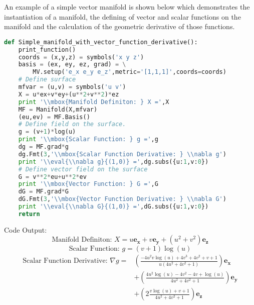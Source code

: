 \documentclass[10pt]{article}
\newcommand{\eval}[2]{\left . {#1} \right |_{#2}}
\begin{document}
An example of a simple vector manifold is shown below which demonstrates the instantiation of a manifold, the defining
of vector and scalar functions on the manifold and the calculation of the geometric derivative of those functions. \\

\begin{lstlisting}[language=Python,showspaces=false,showstringspaces=false,backgroundcolor=\color{gray},frame=single]
def Simple_manifold_with_vector_function_derivative():
    print_function()
    coords = (x,y,z) = symbols('x y z')
    basis = (ex, ey, ez, grad) = \
        MV.setup('e_x e_y e_z',metric='[1,1,1]',coords=coords)
    # Define surface
    mfvar = (u,v) = symbols('u v')
    X = u*ex+v*ey+(u**2+v**2)*ez
    print '\\mbox{Manifold Definiton: } X =',X
    MF = Manifold(X,mfvar)
    (eu,ev) = MF.Basis()
    # Define field on the surface.
    g = (v+1)*log(u)
    print '\\mbox{Scalar Function: } g =',g
    dg = MF.grad*g
    dg.Fmt(3,'\\mbox{Scalar Function Derivative: } \\nabla g')
    print '\\eval{\\nabla g}{(1,0)} =',dg.subs({u:1,v:0})
    # Define vector field on the surface
    G = v**2*eu+u**2*ev
    print '\\mbox{Vector Function: } G =',G
    dG = MF.grad*G
    dG.Fmt(3,'\\mbox{Vector Function Derivative: } \\nabla G')
    print '\\eval{\\nabla G}{(1,0)} =',dG.subs({u:1,v:0})
    return
\end{lstlisting}
Code Output:
\begin{equation*} \mbox{Manifold Definiton: } X = u\bm{e_{x}}+v\bm{e_{y}}+\left ( u^{2} + v^{2}\right ) \bm{e_{z}} \end{equation*}
\begin{equation*} \mbox{Scalar Function: } g = \left(v + 1\right) \log{\left (u \right )} \end{equation*}
 \begin{align*} \mbox{Scalar Function Derivative: } \nabla g =  & \left ( \frac{- 4 u^{2} v \log{\left (u \right )} + 4 v^{3} + 4 v^{2} + v + 1}{u \left(4 u^{2} + 4 v^{2} + 1\right)}\right ) \bm{e_{x}} \\  & +\left ( \frac{4 u^{2} \log{\left (u \right )} - 4 v^{2} - 4 v + \log{\left (u \right )}}{4 u^{2} + 4 v^{2} + 1}\right ) \bm{e_{y}} \\  & +\left ( 2 \frac{v \log{\left (u \right )} + v + 1}{4 u^{2} + 4 v^{2} + 1}\right ) \bm{e_{z}} \\ \end{align*} 
\end{document}
